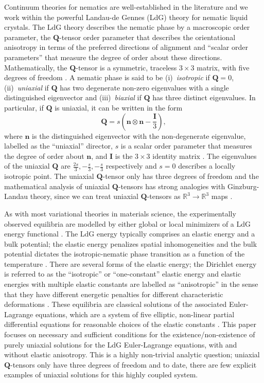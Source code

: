 \documentclass[10pt, a4paper]{article}
\newcommand\n{\mathbf{n}}
\newcommand\Qvec{\mathbf{Q}}
\begin{document}
Continuum theories for nematics are well-established in the literature and we work within the powerful Landau-de Gennes (LdG) theory for nematic liquid crystals. The LdG theory describes the nematic phase by a macroscopic order parameter, the $\mathbf{Q}$-tensor order parameter that describes the orientational anisotropy in terms of the preferred directions of alignment and ``scalar order parameters'' that measure the degree of order about these directions. Mathematically, the  $\Qvec$-tensor is a symmetric, traceless
$3\times3$ matrix, with five degrees of freedom \cite{dg, newtonmottram}. A nematic phase is said to be (i)~\textit{isotropic} if $\Qvec=0$, (ii)~\textit{uniaxial} if $\Qvec$ has two degenerate non-zero eigenvalues with a single distinguished eigenvector and (iii)~\textit{biaxial}
if $\Qvec$ has three distinct eigenvalues.
In particular, if $\Qvec$ is uniaxial, it can be written in the form
\begin{equation}
\label{eq:uniaxial}
\Qvec = s\left( \n \otimes \n - \frac{\mathbf{I}}{3} \right), 
\end{equation}
where $\n$ is the distinguished eigenvector with the non-degenerate eigenvalue, labelled as the ``uniaxial'' director, $s$ is a scalar order parameter that measures the degree of order about $\n$, and $\mathbf{I}$ is the $3 \times 3$ identity matrix \cite{majumdarcpam2012}. The eigenvalues of the uniaxial $\Qvec$ are $\frac{2s}{3}, -\frac{s}{3}, -\frac{s}{3}$ respectively and $s=0$ describes a locally isotropic point. The uniaxial $\Qvec$-tensor only has three degrees of freedom and the mathematical analysis of uniaxial $\Qvec$-tensors has strong analogies with Ginzburg-Landau theory, since we can treat uniaxial $\Qvec$-tensors as $\mathbb{R}^3 \to \mathbb{R}^3$ maps \cite{majumdarcpam2012}.

As with most variational theories in materials science, the experimentally observed equilibria are modelled by either global or local minimizers of a LdG energy functional \cite{dg, newtonmottram, amaz}. The LdG energy typically comprises an elastic energy and a bulk potential; the elastic energy penalizes spatial inhomogeneities and the bulk potential dictates the isotropic-nematic phase transition as a function of the temperature \cite{newtonmottram, amaz}. There are several forms of the elastic energy; the Dirichlet energy is referred to as the ``isotropic'' or ``one-constant'' elastic energy and elastic energies with multiple elastic constants are labelled as ``anisotropic'' in the sense that they have different energetic penalties for different characteristic deformations \cite{gartlanddavis}. These equilibria are classical solutions of the associated Euler-Lagrange equations, which are a system of five elliptic, non-linear partial differential equations for reasonable choices of the elastic constants \cite{gartlanddavis}.  This paper focuses on necessary and sufficient conditions for the existence/non-existence of purely uniaxial solutions for the LdG Euler-Lagrange equations, with and without elastic anisotropy. This is a highly non-trivial analytic question; uniaxial $\mathbf{Q}$-tensors only have three degrees of freedom and to date, there are few explicit examples of uniaxial solutions for this highly coupled system.
\end{document}
